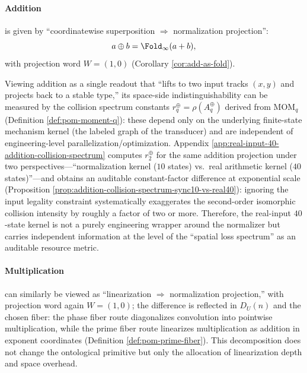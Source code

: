 \paragraph{Addition} is given by ``coordinatewise superposition $\Rightarrow$ normalization projection'':
\[
a\oplus b=\Fold_\infty(a+b),
\]
with projection word $W=(1,0)$ (Corollary \ref{cor:add-as-fold}).

\begin{remark}\label{rem:addition-as-projection-collision-spectrum}
Viewing addition as a single readout that ``lifts to two input tracks \((x,y)\) and projects back to a stable type,'' its space-side indistinguishability can be measured by the collision spectrum constants \(r_q^{\oplus}=\rho(A_q^{\oplus})\) derived from \(\mathrm{MOM}_q\) (Definition \ref{def:pom-moment-q}): these depend only on the underlying finite-state mechanism kernel (the labeled graph of the transducer) and are independent of engineering-level parallelization/optimization.
Appendix \ref{app:real-input-40-addition-collision-spectrum} computes \(r_2^{\oplus}\) for the same addition projection under two perspectives---``normalization kernel ($10$ states) vs.\ real arithmetic kernel ($40$ states)''---and obtains an auditable constant-factor difference at exponential scale (Proposition \ref{prop:addition-collision-spectrum-sync10-vs-real40}):
ignoring the input legality constraint systematically exaggerates the second-order isomorphic collision intensity by roughly a factor of two or more.
Therefore, the real-input $40$-state kernel is not a purely engineering wrapper around the normalizer but carries independent information at the level of the ``spatial loss spectrum'' as an auditable resource metric.
\end{remark}

\paragraph{Multiplication} can similarly be viewed as ``linearization $\Rightarrow$ normalization projection,'' with projection word again $W=(1,0)$; the difference is reflected in $D_U(n)$ and the chosen fiber: the phase fiber route diagonalizes convolution into pointwise multiplication, while the prime fiber route linearizes multiplication as addition in exponent coordinates (Definition \ref{def:pom-prime-fiber}). This decomposition does not change the ontological primitive but only the allocation of linearization depth and space overhead.

